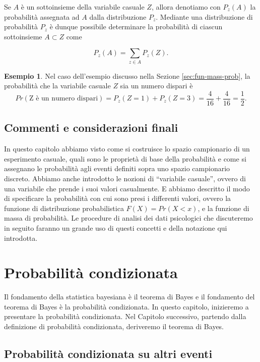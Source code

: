 \documentclass[
  11pt,
]{krantz}
\theoremstyle{definition}
\theoremstyle{definition}
\newtheorem{example}{Esempio}[chapter]
\theoremstyle{definition}
\theoremstyle{definition}
\theoremstyle{remark}
\begin{document}
Se \(A\) è un sottoinsieme della variabile casuale \(Z\), allora denotiamo con \(P_{z}(A)\) la probabilità assegnata ad \(A\) dalla distribuzione \(P_{z}\). Mediante una distribuzione di probabilità \(P_{z}\) è dunque possibile determinare la probabilità di ciascun sottoinsieme \(A \subset Z\) come

\[
P_{z}(A) = \sum_{z \in A} P_{z}(Z).
\]

\begin{example}
Nel caso dell'esempio discusso nella Sezione \ref{sec:fun-mass-prob}, la probabilità che la variabile casuale \(Z\) sia un numero dispari è \[
Pr(\text{Z è un numero dispari}) = P_{z}(Z = 1) + P_{z}(Z = 3) = \frac{4}{16} + \frac{4}{16} = \frac{1}{2}.
\]
\end{example}

\hypertarget{commenti-e-considerazioni-finali}{%
\section*{Commenti e considerazioni finali}\label{commenti-e-considerazioni-finali}}


In questo capitolo abbiamo visto come si costruisce lo spazio campionario di un esperimento casuale, quali sono le proprietà di base della probabilità e come si assegnano le probabilità agli eventi definiti sopra uno spazio campionario discreto. Abbiamo anche introdotto le nozioni di ``variabile casuale'', ovvero di una variabile che prende i suoi valori casualmente. E abbiamo descritto il modo di specificare la probabilità con cui sono presi i differenti valori, ovvero la funzione di distribuzione probabilistica \(F(X) = Pr(X < x)\), e la funzione di massa di probabilità. Le procedure di analisi dei dati psicologici che discuteremo in seguito faranno un grande uso di questi concetti e della notazione qui introdotta.

\hypertarget{chapter-prob-cond}{%
\chapter{Probabilità condizionata}\label{chapter-prob-cond}}

Il fondamento della statistica bayesiana è il teorema di Bayes e il fondamento del teorema di Bayes è la probabilità condizionata. In questo capitolo, inizieremo a presentare la probabilità condizionata. Nel Capitolo successivo, partendo dalla definizione di probabilità condizionata, deriveremo il teorema di Bayes.

\hypertarget{probabilituxe0-condizionata-su-altri-eventi}{%
\section{Probabilità condizionata su altri eventi}\label{probabilituxe0-condizionata-su-altri-eventi}}
\end{document}
